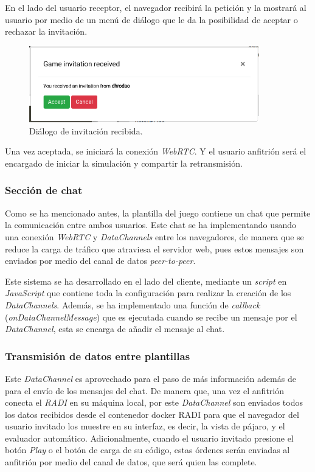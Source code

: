 \documentclass[a4paper, 12pt]{book}
\begin{document}
En el lado del usuario receptor, el navegador recibirá la petición y la mostrará al usuario por medio de un menú de diálogo que le da la posibilidad de aceptar o rechazar la invitación.
\begin{figure}[H]
	\centering
    \includegraphics[width=10cm]{img/invitation.png}
    \caption{Diálogo de invitación recibida.}
    \label{figura:diagrama_conexion_webrtc}
\end{figure}


Una vez aceptada, se iniciará la conexión \emph{WebRTC}. Y el usuario anfitrión será el encargado de iniciar la simulación y compartir la retransmisión.

\subsubsection{Sección de chat}

Como se ha mencionado antes, la plantilla del juego contiene un chat que permite la comunicación entre ambos usuarios. Este chat se ha implementando usando una conexión \emph{WebRTC} y \emph{DataChannels} entre los navegadores, de manera que se reduce la carga de tráfico que atraviesa el servidor web, pues estos mensajes son enviados por medio del canal de datos \emph{peer-to-peer}.

Este sistema se ha desarrollado en el lado del cliente, mediante un \emph{script} en \emph{JavaScript} que contiene toda la configuración para realizar la creación de los \emph{DataChannels}. Además, se ha implementado una función de \emph{callback} (\emph{onDataChannelMessage}) que es ejecutada cuando se recibe un mensaje por el \emph{DataChannel}, esta se encarga de añadir el mensaje al chat.

\subsubsection{Transmisión de datos entre plantillas}

Este \emph{DataChannel} es aprovechado para el paso de más información además de para el envío de los mensajes del chat. De manera que, una vez el anfitrión conecta el \emph{RADI} en su máquina local, por este \emph{DataChannel} son enviados todos los datos recibidos desde el contenedor docker RADI para que el navegador del usuario invitado los muestre en su interfaz, es decir, la vista de pájaro, y el evaluador automático. Adicionalmente, cuando el usuario invitado presione el botón \emph{Play} o el botón de carga de su código, estas órdenes serán enviadas al anfitrión por medio del canal de datos, que será quien las complete.
\end{document}
